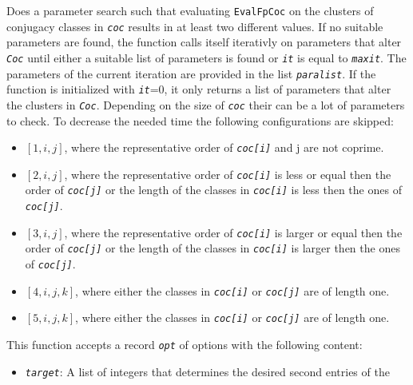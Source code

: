 \documentclass[a4paper,11pt]{report}
\begin{document}
{{{ Does a parameter search such that evaluating \texttt{EvalFpCoc} on the clusters of conjugacy classes in \mbox{\texttt{\mdseries\slshape coc}} results in at least two different values. If no suitable parameters are found,
the function calls itself iterativly on parameters that alter \mbox{\texttt{\mdseries\slshape Coc}} until either a suitable list of parameters is found or \mbox{\texttt{\mdseries\slshape it}} is equal to \mbox{\texttt{\mdseries\slshape maxit}}. The parameters of the current iteration are provided in the list \mbox{\texttt{\mdseries\slshape paralist}}. If the function is initialized with \mbox{\texttt{\mdseries\slshape it}}=0, it only returns a list of parameters that alter the clusters in \mbox{\texttt{\mdseries\slshape Coc}}. Depending on the size of \mbox{\texttt{\mdseries\slshape coc}} their can be a lot of parameters to check. To decrease the needed time the
following configurations are skipped: 
\begin{itemize}
\item  $[1,i,j]$, where the representative order of \mbox{\texttt{\mdseries\slshape coc[i]}} and j are not coprime. 
\item  $[2,i,j]$, where the representative order of \mbox{\texttt{\mdseries\slshape coc[i]}} is less or equal then the order of \mbox{\texttt{\mdseries\slshape coc[j]}} or the length of the classes in \mbox{\texttt{\mdseries\slshape coc[i]}} is less then the ones of \mbox{\texttt{\mdseries\slshape coc[j]}}. 
\item  $[3,i,j]$, where the representative order of \mbox{\texttt{\mdseries\slshape coc[i]}} is larger or equal then the order of \mbox{\texttt{\mdseries\slshape coc[j]}} or the length of the classes in \mbox{\texttt{\mdseries\slshape coc[i]}} is larger then the ones of \mbox{\texttt{\mdseries\slshape coc[j]}}. 
\item  $[4,i,j,k]$, where either the classes in \mbox{\texttt{\mdseries\slshape coc[i]}} or \mbox{\texttt{\mdseries\slshape coc[j]}} are of length one. 
\item  $[5,i,j,k]$, where either the classes in \mbox{\texttt{\mdseries\slshape coc[i]}} or \mbox{\texttt{\mdseries\slshape coc[j]}} are of length one. 
\end{itemize}
 This function accepts a record \mbox{\texttt{\mdseries\slshape opt}} of options with the following content: 
\begin{itemize}
\item  \mbox{\texttt{\mdseries\slshape target}}: A list of integers that determines the desired second entries of the

\end{itemize}}}}
\end{document}
